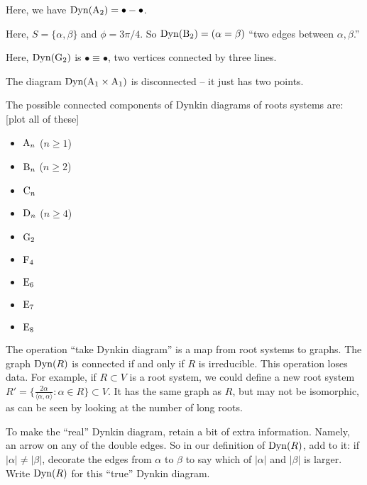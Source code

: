 \begin{example}
Here, we have $\operatorname{Dyn}(\mathrm{A}_2)=\bullet-\bullet$. 
\end{example}

\begin{example}
Here, $S=\{\alpha,\beta\}$ and $\phi=3\pi/4$. So 
$\operatorname{Dyn}(\mathrm{B}_2)=(\alpha=\beta)$ ``two edges between $\alpha,\beta$.''
\end{example}

\begin{example}
Here, $\operatorname{Dyn}(\mathrm{G}_2)$ is $\bullet\equiv\bullet$, two vertices connected 
by three lines. 
\end{example}

\begin{example}
The diagram $\operatorname{Dyn}(\mathrm{A}_1\times \mathrm{A}_1)$ is disconnected -- it just has 
two points. 
\end{example}

\begin{theorem}
The possible connected components of Dynkin diagrams of roots systems are: 
[plot all of these]
\begin{itemize}
  \item $\mathrm{A}_n$ ($n\geqslant 1$)
  \item $\mathrm{B}_n$ ($n\geqslant 2$)
  \item $\mathrm{C}_n$ 
  \item $\mathrm{D}_n$ ($n\geqslant 4$)
  \item $\mathrm{G}_2$
  \item $\mathrm{F}_4$
  \item $\mathrm{E}_6$
  \item $\mathrm{E}_7$
  \item $\mathrm{E}_8$
\end{itemize}
\end{theorem}

The operation ``take Dynkin diagram'' is a map from root systems to graphs. 
The graph $\operatorname{Dyn}(R)$ is connected if and only if $R$ is irreducible. This 
operation loses data. For example, if $R\subset V$ is a root system, we could 
define a new root system 
$R'=\{\frac{2\alpha}{\langle\alpha,\alpha\rangle}:\alpha\in R\}\subset V$. It 
has the same graph as $R$, but may not be isomorphic, as can be seen by looking 
at the number of long roots. 

To make the ``real'' Dynkin diagram, retain a bit of extra information. 
Namely, an arrow on any of the double edges. So in our definition of 
$\operatorname{Dyn}(R)$, add to it: if $|\alpha|\ne |\beta|$, decorate the edges from 
$\alpha$ to $\beta$ to say which of $|\alpha|$ and $|\beta|$ is larger. 
Write $\operatorname{Dyn}(R)$ for this ``true'' Dynkin diagram. 


